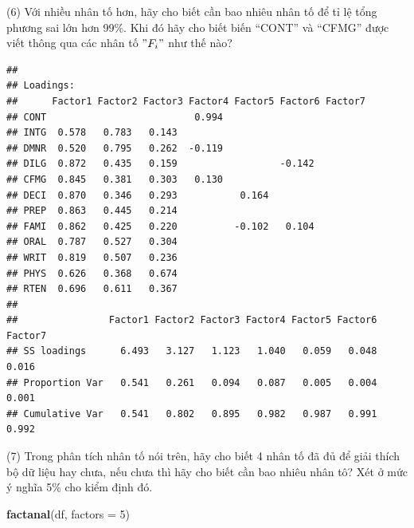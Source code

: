 \documentclass[
]{article}
\newenvironment{Shaded}{\begin{snugshade}}{\end{snugshade}}
\newcommand{\AttributeTok}[1]{\textcolor[rgb]{0.13,0.29,0.53}{#1}}
\newcommand{\DecValTok}[1]{\textcolor[rgb]{0.00,0.00,0.81}{#1}}
\newcommand{\FunctionTok}[1]{\textcolor[rgb]{0.13,0.29,0.53}{\textbf{#1}}}
\newcommand{\NormalTok}[1]{#1}
\newcommand{\OtherTok}[1]{\textcolor[rgb]{0.56,0.35,0.01}{#1}}
\newcommand{\SpecialCharTok}[1]{\textcolor[rgb]{0.81,0.36,0.00}{\textbf{#1}}}
\begin{document}
\hfill\break
(6) Với nhiều nhân tố hơn, hãy cho biết cần bao nhiêu nhân tố để tỉ lệ
tổng phương sai lớn hơn 99\%. Khi đó hãy cho biết biến ``CONT'' và
``CFMG'' được viết thông qua các nhân tố \("F_i"\) như thế nào?

\begin{Shaded}
\end{Shaded}

\begin{verbatim}
## 
## Loadings:
##      Factor1 Factor2 Factor3 Factor4 Factor5 Factor6 Factor7
## CONT                          0.994                         
## INTG  0.578   0.783   0.143                                 
## DMNR  0.520   0.795   0.262  -0.119                         
## DILG  0.872   0.435   0.159                  -0.142         
## CFMG  0.845   0.381   0.303   0.130                         
## DECI  0.870   0.346   0.293           0.164                 
## PREP  0.863   0.445   0.214                                 
## FAMI  0.862   0.425   0.220          -0.102   0.104         
## ORAL  0.787   0.527   0.304                                 
## WRIT  0.819   0.507   0.236                                 
## PHYS  0.626   0.368   0.674                                 
## RTEN  0.696   0.611   0.367                                 
## 
##                Factor1 Factor2 Factor3 Factor4 Factor5 Factor6 Factor7
## SS loadings      6.493   3.127   1.123   1.040   0.059   0.048   0.016
## Proportion Var   0.541   0.261   0.094   0.087   0.005   0.004   0.001
## Cumulative Var   0.541   0.802   0.895   0.982   0.987   0.991   0.992
\end{verbatim}

\hfill\break
(7) Trong phân tích nhân tố nói trên, hãy cho biết 4 nhân tố đã đủ để
giải thích bộ dữ liệu hay chưa, nếu chưa thì hãy cho biết cần bao nhiêu
nhân tô? Xét ở mức ý nghĩa 5\% cho kiểm định đó.

\begin{Shaded}
\begin{Highlighting}[]
\FunctionTok{factanal}\NormalTok{(df, }\AttributeTok{factors =} \DecValTok{5}\NormalTok{)}
\end{Highlighting}
\end{Shaded}
\end{document}
